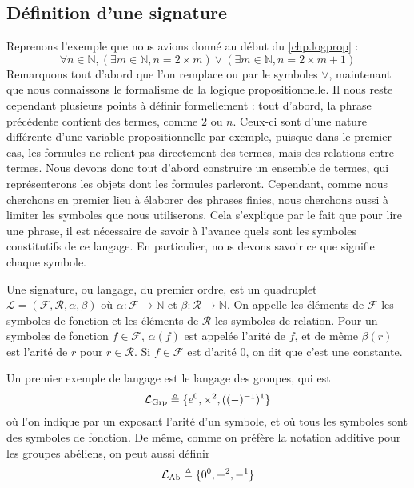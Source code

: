 \subsection{Définition d'une signature}

Reprenons l'exemple que nous avions donné au début du \cref{chp.logprop} :
\[\forall n \in \mathbb N, (\exists m \in \mathbb N, n = 2\times m) \lor
(\exists m \in \mathbb N, n = 2 \times m + 1)\]
Remarquons tout d'abord que l'on remplace \og ou\fg{} par le symboles $\lor$,
maintenant que nous connaissons le formalisme de la logique propositionnelle.
Il nous reste cependant plusieurs points à définir formellement : tout d'abord,
la phrase précédente contient des termes, comme $2$ ou $n$. Ceux-ci sont d'une
nature différente d'une variable propositionnelle par exemple, puisque dans le
premier cas, les formules ne relient pas directement des termes, mais des
relations entre termes. Nous devons donc tout d'abord construire un ensemble de
termes, qui représenterons les objets dont les formules parleront. Cependant,
comme nous cherchons en premier lieu à élaborer des phrases finies, nous
cherchons aussi à limiter les symboles que nous utiliserons. Cela s'explique par
le fait que pour lire une phrase, il est nécessaire de savoir à l'avance quels
sont les symboles constitutifs de ce langage. En particulier, nous devons savoir
ce que signifie chaque symbole.

\begin{definition}[Signature]
  Une signature, ou langage, du premier ordre, est un quadruplet $\mathcal L =
  (\mathcal F,\mathcal R, \alpha,\beta)$ où $\alpha : \mathcal F \to \mathbb N$
  et $\beta : \mathcal R \to \mathbb N$. On appelle les éléments de $\mathcal F$
  les symboles de fonction et les éléments de $\mathcal R$ les symboles de
  relation. Pour un symboles de fonction $f\in\mathcal F$, $\alpha(f)$ est
  appelée l'arité de $f$, et de même $\beta(r)$ est l'arité de $r$ pour
  $r\in\mathcal R$. Si $f\in\mathcal F$ est d'arité $0$, on dit que c'est une
  constante.
\end{definition}

\begin{example}
  Un premier exemple de langage est le langage des groupes, qui est
  \[\mathcal L_{\mathrm{Grp}} \triangleq \{e^0,\times^2,((-)^{-1})^1\}\]
  où l'on indique par un exposant l'arité d'un symbole, et où tous les symboles
  sont des symboles de fonction. De même, comme on préfère la notation additive
  pour les groupes abéliens, on peut aussi définir
  \[\mathcal L_{\mathrm{Ab}} \triangleq \{0^0,+^2,-^1\}\]
\end{example}

